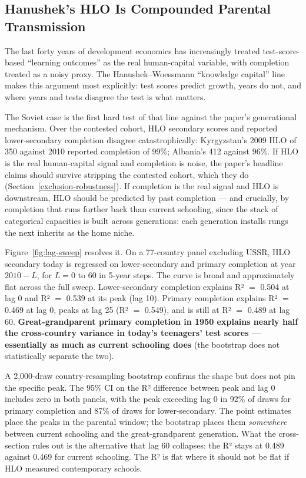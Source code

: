 \documentclass[12pt,letterpaper]{article}
\begin{document}
\subsection{Hanushek's HLO Is Compounded Parental Transmission}\label{hanushek-reconciliation}

The last forty years of development economics has increasingly
treated test-score-based ``learning outcomes'' as the real
human-capital variable, with completion treated as a noisy proxy.
The Hanushek--Woessmann ``knowledge capital'' line makes this
argument most explicitly: test scores predict growth, years do not,
and where years and tests disagree the test is what matters.

The Soviet case is the first hard test of that line against the
paper's generational mechanism. Over the contested cohort, HLO
secondary scores and reported lower-secondary completion disagree
catastrophically: Kyrgyzstan's 2009 HLO of 350 against 2010 reported
completion of 99\%; Albania's 412 against 96\%. If HLO is the real
human-capital signal and completion is noise, the paper's headline
claims should survive stripping the contested cohort, which they do
(Section~\ref{exclusion-robustness}). If completion is the real
signal and HLO is downstream, HLO should be predicted by past
completion --- and crucially, by completion that runs further back
than current schooling, since the stack of categorical capacities
is built across generations: each generation installs rungs the
next inherits as the home niche.

Figure~\ref{fig:lag-sweep} resolves it. On a 77-country panel
excluding USSR, HLO secondary today is regressed on lower-secondary
and primary completion at year $2010 - L$, for $L = 0$ to $60$ in
5-year steps. The curve is broad and approximately flat across the
full sweep. Lower-secondary completion explains R² $=$ 0.504 at lag
0 and R² $=$ 0.539 at its peak (lag 10). Primary completion explains
R² $=$ 0.469 at lag 0, peaks at lag 25 (R² $=$ 0.549), and is still
at R² $=$ 0.489 at lag 60. \textbf{Great-grandparent primary
completion in 1950 explains nearly half the cross-country variance
in today's teenagers' test scores --- essentially as much as current
schooling does} (the bootstrap does not statistically separate the two).

A 2,000-draw country-resampling bootstrap confirms the shape but
does not pin the specific peak. The 95\% CI on the R² difference
between peak and lag 0 includes zero in both panels, with the peak
exceeding lag 0 in 92\% of draws for primary completion and 87\% of
draws for lower-secondary. The point estimates place the peaks in
the parental window; the bootstrap places them \emph{somewhere}
between current schooling and the great-grandparent generation. What
the cross-section rules out is the alternative that lag 60 collapses:
the R² stays at 0.489 against 0.469 for current schooling. The R² is
flat where it should not be flat if HLO measured contemporary schools.
\end{document}
